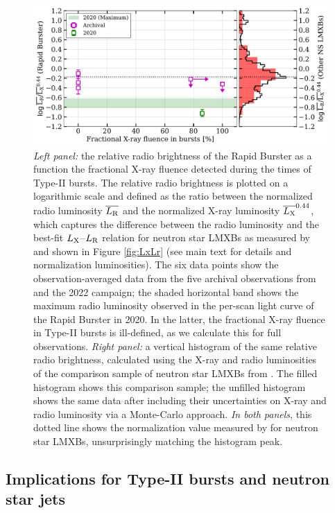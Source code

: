 \documentclass[fleqn,usenatbib]{mnras}
\begin{document}
\begin{figure}
\includegraphics[width=\textwidth]{LxLrRatio_1panel.pdf}
 \caption{\textit{Left panel:} the relative radio brightness of the Rapid Burster as a function the fractional X-ray fluence detected during the times of Type-II bursts. The relative radio brightness is plotted on a logarithmic scale and defined as the ratio between the normalized radio luminosity $\overline{L_{\rm R}}$ and the normalized X-ray luminosity $\overline{L_{\rm X}}^{0.44}$, which captures the difference between the radio luminosity and the best-fit $L_{\rm X}$--$L_{\rm R}$ relation for neutron star LMXBs as measured by \citet{gallo18} and shown in Figure \ref{fig:LxLr} (see main text for details and normalization luminosities). The six data points show the observation-averaged data from the five archival observations from \citet{moore2000} and the 2022 campaign; the shaded horizontal band shows the maximum radio luminosity observed in the per-scan light curve of the Rapid Burster in 2020. In the latter, the fractional X-ray fluence in Type-II bursts is ill-defined, as we calculate this for full observations. \textit{Right panel:} a vertical histogram of the same relative radio brightness, calculated using the X-ray and radio luminosities of the comparison sample of neutron star LMXBs from \citet{bahramian2022}. The filled histogram shows this comparison sample; the unfilled histogram shows the same data after including their uncertainties on X-ray and radio luminosity via a Monte-Carlo approach. \textit{In both panels}, this dotted line shows the normalization value measured by \citet{gallo18} for neutron star LMXBs, unsurprisingly matching the histogram peak.}
 \label{fig:LxLrRatio}
\end{figure}

\subsection{Implications for Type-II bursts and neutron star jets}
\end{document}
